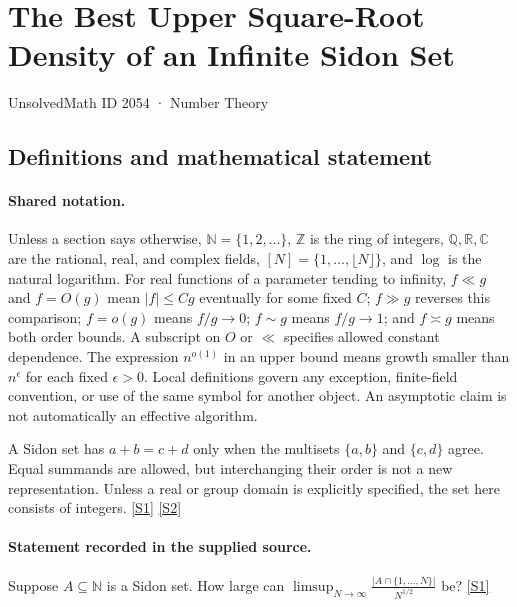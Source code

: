 \documentclass[11pt,a4paper]{article}
\newcommand{\N}{\mathbb{N}}
\newcommand{\Z}{\mathbb{Z}}
\newcommand{\Q}{\mathbb{Q}}
\newcommand{\R}{\mathbb{R}}
\newcommand{\C}{\mathbb{C}}
\newcommand{\sref}[2]{\hyperlink{source:#1:#2}{[S#2]}}
\begin{document}

\setcounter{section}{2053}

\section{The Best Upper Square-Root Density of an Infinite Sidon Set}\label{2054}

{\small\sffamily UnsolvedMath ID 2054 · Number Theory}

\subsection{Definitions and mathematical statement}

\paragraph{Shared notation.}Unless a section says otherwise, $\N=\{1,2,\ldots\}$,
$\Z$ is the ring of integers, $\Q,\R,\C$ are the rational, real, and complex
fields, $[N]=\{1,\ldots,\lfloor N\rfloor\}$, and $\log$ is the natural
logarithm. For real functions of a parameter tending to infinity,
$f\ll g$ and $f=O(g)$ mean $|f|\leq Cg$ eventually for some fixed $C$;
$f\gg g$ reverses this comparison; $f=o(g)$ means $f/g\to0$;
$f\sim g$ means $f/g\to1$; and $f\asymp g$ means both order bounds.
A subscript on $O$ or $\ll$ specifies allowed constant dependence.
The expression $n^{o(1)}$ in an upper bound means growth smaller than
$n^\epsilon$ for each fixed $\epsilon>0$. Local definitions govern any
exception, finite-field convention, or use of the same symbol for another
object. An asymptotic claim is not automatically an effective algorithm.



A Sidon set has $a+b=c+d$ only when the multisets $\{a,b\}$ and $\{c,d\}$ agree. Equal summands are allowed, but interchanging their order is not a new representation. Unless a real or group domain is explicitly specified, the set here consists of integers. \sref{2054}{1} \sref{2054}{2}

\paragraph{Statement recorded in the supplied source.}
Suppose $A\subseteq \mathbb{N}$ is a Sidon set. How large can $ \limsup_{N\to \infty}\frac{\lvert A\cap \{1,\ldots,N\}\rvert}{N^{1/2}} $ be? \sref{2054}{1}
\end{document}
